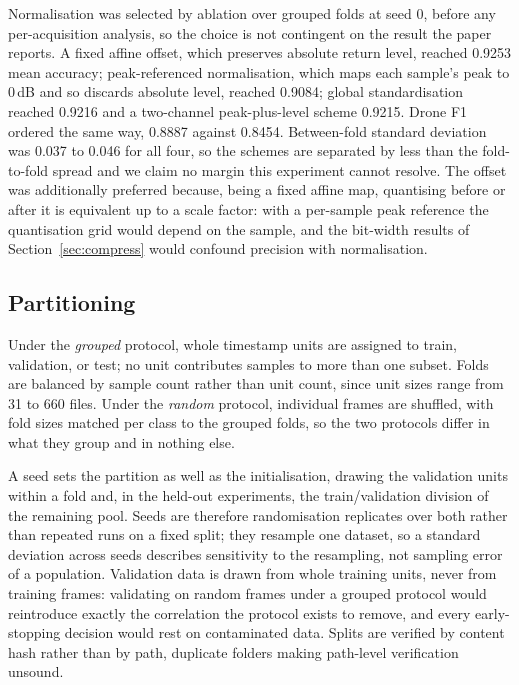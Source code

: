 \documentclass[11pt,a4paper]{article}
\begin{document}
Normalisation was selected by ablation over grouped folds at seed 0, before any per-acquisition analysis, so the choice is not contingent on the result the paper reports. A fixed affine offset, which preserves absolute return level, reached 0.9253 mean accuracy; peak-referenced normalisation, which maps each sample's peak to 0\,dB and so discards absolute level, reached 0.9084; global standardisation reached 0.9216 and a two-channel peak-plus-level scheme 0.9215. Drone F1 ordered the same way, 0.8887 against 0.8454. Between-fold standard deviation was 0.037 to 0.046 for all four, so the schemes are separated by less than the fold-to-fold spread and we claim no margin this experiment cannot resolve. The offset was additionally preferred because, being a fixed affine map, quantising before or after it is equivalent up to a scale factor: with a per-sample peak reference the quantisation grid would depend on the sample, and the bit-width results of Section~\ref{sec:compress} would confound precision with normalisation.

\subsection{Partitioning}

Under the \emph{grouped} protocol, whole timestamp units are assigned to train, validation, or test; no unit contributes samples to more than one subset. Folds are balanced by sample count rather than unit count, since unit sizes range from 31 to 660 files. Under the \emph{random} protocol, individual frames are shuffled, with fold sizes matched per class to the grouped folds, so the two protocols differ in what they group and in nothing else.

A seed sets the partition as well as the initialisation, drawing the validation units within a fold and, in the held-out experiments, the train/validation division of the remaining pool. Seeds are therefore randomisation replicates over both rather than repeated runs on a fixed split; they resample one dataset, so a standard deviation across seeds describes sensitivity to the resampling, not sampling error of a population. Validation data is drawn from whole training units, never from training frames: validating on random frames under a grouped protocol would reintroduce exactly the correlation the protocol exists to remove, and every early-stopping decision would rest on contaminated data. Splits are verified by content hash rather than by path, duplicate folders making path-level verification unsound.
\end{document}
